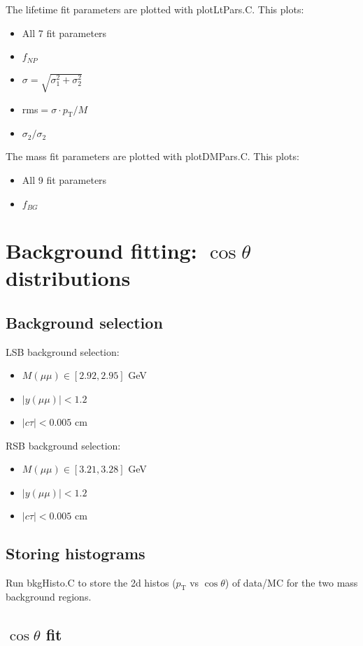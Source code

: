 \documentclass{article}
\newcommand{\pt}{p_\text{T}}
\newcommand{\cost}{\cos\theta}
\begin{document}
The lifetime fit parameters are plotted with plotLtPars.C. This plots:
\begin{itemize}
\item All 7 fit parameters
\item $f_{NP}$
\item $\sigma=\sqrt{\sigma_1^2+\sigma_2^2}$
\item rms$=\sigma\cdot\pt/M$
\item $\sigma_2/\sigma_2$
\end{itemize}

The mass fit parameters are plotted with plotDMPars.C. This plots:
\begin{itemize}
\item All 9 fit parameters
\item $f_{BG}$
\end{itemize}

\pagebreak

\section{Background fitting: $\cost$ distributions}
\subsection{Background selection}

LSB background selection:
\begin{itemize}
\item $M(\mu\mu)\in[2.92,2.95]$ GeV
\item $|y(\mu\mu)|<1.2$
\item $|c\tau| < 0.005$ cm
\end{itemize}

RSB background selection:
\begin{itemize}
\item $M(\mu\mu)\in[3.21,3.28]$ GeV
\item $|y(\mu\mu)|<1.2$
\item $|c\tau| < 0.005$ cm
\end{itemize}

\subsection{Storing histograms}

Run bkgHisto.C to store the 2d histos ($\pt$ vs $\cost$) of data/MC for the two mass background regions.

\subsection{$\cost$ fit}
\end{document}
